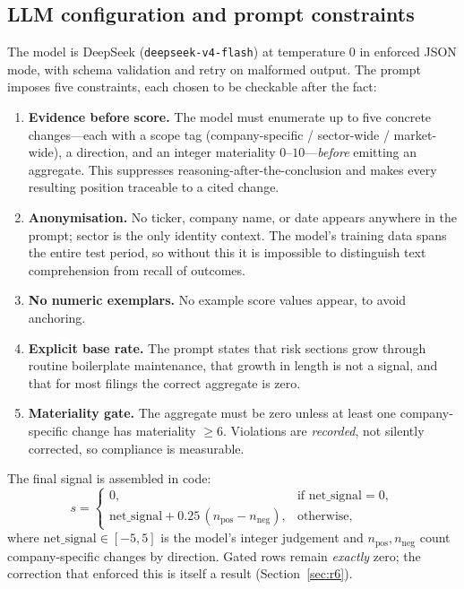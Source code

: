 \documentclass[11pt]{article}
\newcommand{\sig}[1]{\texttt{#1}}
\begin{document}
\subsection{LLM configuration and prompt constraints}
\label{sec:llm}

The model is DeepSeek (\sig{deepseek-v4-flash}) at temperature $0$ in enforced JSON mode,
with schema validation and retry on malformed output. The prompt imposes five constraints,
each chosen to be checkable after the fact:

\begin{enumerate}[leftmargin=1.6em,itemsep=0.2em]
  \item \textbf{Evidence before score.} The model must enumerate up to five concrete
        changes---each with a scope tag (company-specific / sector-wide / market-wide), a
        direction, and an integer materiality $0$--$10$---\emph{before} emitting an
        aggregate. This suppresses reasoning-after-the-conclusion and makes every
        resulting position traceable to a cited change.
  \item \textbf{Anonymisation.} No ticker, company name, or date appears anywhere in the
        prompt; sector is the only identity context. The model's training data spans the
        entire test period, so without this it is impossible to distinguish text
        comprehension from recall of outcomes.
  \item \textbf{No numeric exemplars.} No example score values appear, to avoid anchoring.
  \item \textbf{Explicit base rate.} The prompt states that risk sections grow through
        routine boilerplate maintenance, that growth in length is not a signal, and that
        for most filings the correct aggregate is zero.
  \item \textbf{Materiality gate.} The aggregate must be zero unless at least one
        company-specific change has materiality $\geq 6$. Violations are
        \emph{recorded}, not silently corrected, so compliance is measurable.
\end{enumerate}

The final signal is assembled in code:
\[
s =
\begin{cases}
0, & \text{if } \mathrm{net\_signal} = 0,\\[0.25em]
\mathrm{net\_signal} + 0.25\,(n_{\text{pos}} - n_{\text{neg}}), & \text{otherwise,}
\end{cases}
\]
where $\mathrm{net\_signal} \in [-5, 5]$ is the model's integer judgement and
$n_{\text{pos}}, n_{\text{neg}}$ count company-specific changes by direction. Gated rows
remain \emph{exactly} zero; the correction that enforced this is itself a result
(Section~\ref{sec:r6}).
\end{document}
